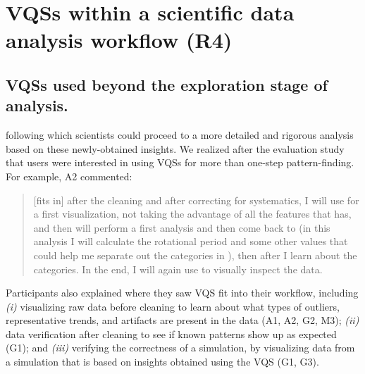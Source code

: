 \section{VQSs within a scientific data analysis workflow (R4)}
\subsection{VQSs used beyond the exploration stage of analysis.} 
\par {}  following which scientists could proceed to a more detailed and rigorous analysis based on these newly-obtained insights. We realized after the evaluation study that users were interested in using VQSs for more than one-step pattern-finding. For example, A2 commented:
\begin{quote}
[\zv fits in] after the cleaning and after correcting for systematics, I will use \zv for a first visualization, not taking the advantage of all the features that \zv has, and then will perform a first analysis and then come back to \zv (in this analysis I will calculate the rotational period and some other values that could help me separate out the categories in \zv), then after I learn about the categories. In the end, I will again use \zv to visually inspect the data. %
\end{quote}
Participants also explained where they saw VQS fit into their workflow, including {\em (i)}
visualizing raw data before cleaning to learn about what types of outliers, representative trends, and artifacts are present in the data (A1, A2, G2, M3); {\em (ii)}
 data verification after cleaning to see if known patterns show up as expected (G1);
 and {\em (iii)}
verifying the correctness of a simulation, by visualizing data from a simulation that is based on insights obtained using the VQS (G1, G3).
